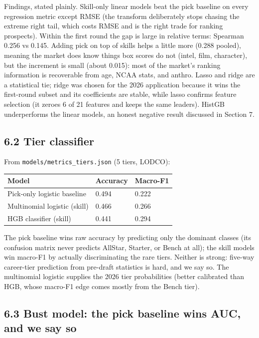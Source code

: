 \documentclass[
  10pt,
]{article}
\newcounter{none} %
\begin{document}
Findings, stated plainly. Skill-only linear models beat the pick baseline on
every regression metric except RMSE (the transform deliberately stops chasing
the extreme right tail, which costs RMSE and is the right trade for ranking
prospects). Within the first round the gap is large in relative terms: Spearman
0.256 vs 0.145. Adding pick on top of skills helps a little more (0.288 pooled),
meaning the market does know things box scores do not (intel, film, character),
but the increment is small (about 0.015): most of the market's ranking
information is recoverable from age, NCAA stats, and anthro. Lasso and ridge are
a statistical tie; ridge was chosen for the 2026 application because it wins the
first-round subset and its coefficients are stable, while lasso confirms feature
selection (it zeroes 6 of 21 features and keeps the same leaders). HistGB
underperforms the linear models, an honest negative result discussed in Section
7.

\subsection{6.2 Tier classifier}\label{tier-classifier}

From \texttt{models/metrics\_tiers.json} (5 tiers, LODCO):

{\def\LTcaptype{none} %
\begin{longtable}[]{@{}lll@{}}
\toprule\noalign{}
Model & Accuracy & Macro-F1 \\
\midrule\noalign{}
\endhead
\bottomrule\noalign{}
\endlastfoot
Pick-only logistic baseline & 0.494 & 0.222 \\
Multinomial logistic (skill) & 0.466 & 0.266 \\
HGB classifier (skill) & 0.441 & 0.294 \\
\end{longtable}
}

The pick baseline wins raw accuracy by predicting only the dominant classes (its
confusion matrix never predicts AllStar, Starter, or Bench at all); the skill
models win macro-F1 by actually discriminating the rare tiers. Neither is
strong: five-way career-tier prediction from pre-draft statistics is hard, and
we say so. The multinomial logistic supplies the 2026 tier probabilities (better
calibrated than HGB, whose macro-F1 edge comes mostly from the Bench tier).

\subsection{6.3 Bust model: the pick baseline wins AUC, and we say
so}\label{bust-model-the-pick-baseline-wins-auc-and-we-say-so}
\end{document}
